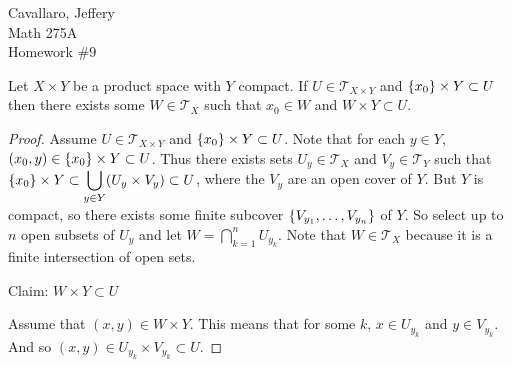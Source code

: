 \documentclass[letterpaper,12pt,fleqn]{article}
\newcommand{\T}{\mathscr{T}}
\begin{document}
Cavallaro, Jeffery \\
Math 275A \\
Homework \#9

\bigskip

\begin{theorem}[6.18]
  Let \(X\times Y\) be a product space with \(Y\) compact.  If \(U\in\T_{X\times Y}\) and
  \(\{x_0\}\times Y\subset U\) then there exists some \(W\in\T_X\) such that \(x_0\in W\) and
  \(W\times Y\subset U\).
\end{theorem}

\begin{proof}
  Assume \(U\in\T_{X\times Y}\) and \(\{x_0\}\times Y\subset U\).  Note that for each \(y\in Y\),
  \((x_0,y)\in\{x_0\}\times Y\subset U\).  Thus there exists sets \(U_y\in\T_X\) and \(V_y\in\T_Y\) such that
  \(\displaystyle\{x_0\}\times Y\subset\bigcup_{y\in Y}(U_y\times V_y)\subset U\), where the \(V_y\) are an open
  cover of \(Y\).  But \(Y\) is compact, so there exists some finite subcover \(\{V_{y_1},\ldots,V_{y_n}\}\) of
  \(Y\).  So select up to \(n\) open subsets of \(U_y\) and let \(\displaystyle W=\bigcap_{k=1}^nU_{y_k}\).  Note
  that \(W\in\T_X\) because it is a finite intersection of open sets.

  Claim: \(W\times Y\subset U\)

  Assume that \((x,y)\in W\times Y\).  This means that for some \(k\), \(x\in U_{y_k}\) and \(y\in V_{y_k}\).  And so
  \((x,y)\in U_{y_k}\times V_{y_k}\subset U\).
\end{proof}
\end{document}
